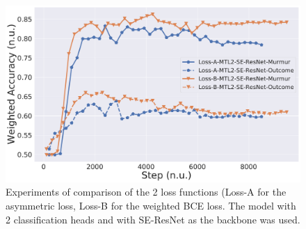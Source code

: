 

\begin{figure}[!htp]
\centering
\includegraphics[width=\linewidth]{images/clf-se-resnet-lossA-vs-lossB.pdf}
\caption[]
{Experiments of comparison of the 2 loss functions (Loss-A for the asymmetric loss, Loss-B for the weighted BCE loss. The model with 2 classification heads and with SE-ResNet as the backbone was used.}
\label{fig:clf-se-resnet-lossA-vs-lossB}
\end{figure}
